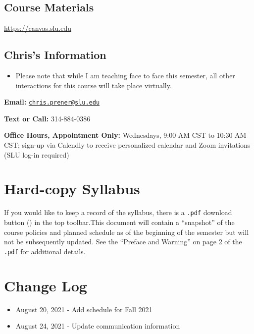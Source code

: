 \documentclass[
]{book}
\providecommand{\tightlist}{%
  \setlength{\itemsep}{0pt}\setlength{\parskip}{0pt}}
\newenvironment{rmdblock}[1]
  {\begin{shaded*}
  \begin{itemize}
  \renewcommand{\labelitemi}{
    \raisebox{-.7\height}[0pt][0pt]{
      {\setkeys{Gin}{width=3em,keepaspectratio}\texttt{[image: images/\#1]}}
    }
  }
  \item
  }
  {
  \end{itemize}
  \end{shaded*}
  }
\newenvironment{rmdwarning}
  {\begin{rmdblock}{warning}}
  {\end{rmdblock}}
\begin{document}
\hypertarget{course-materials}{%
\subsection*{Course Materials}\label{course-materials}}

\url{https://canvas.slu.edu}

\hypertarget{chriss-information}{%
\subsection*{Chris's Information}\label{chriss-information}}

\begin{rmdwarning}
Please note that while I am teaching face to face this semester, all
other interactions for this course will take place virtually.
\end{rmdwarning}

\textbf{Email:} \href{mailto:chris.prener@slu.edu}{\nolinkurl{chris.prener@slu.edu}}

\textbf{Text or Call:} 314-884-0386

\textbf{Office Hours, Appointment Only:} Wednesdays, 9:00 AM CST to 10:30 AM CST; sign-up via Calendly to receive personalized calendar and Zoom invitations (SLU log-in required)

\hypertarget{hard-copy-syllabus}{%
\section*{Hard-copy Syllabus}\label{hard-copy-syllabus}}

If you would like to keep a record of the syllabus, there is a \texttt{.pdf} download button () in the top toolbar.This document will contain a ``snapshot'' of the course policies and planned schedule as of the beginning of the semester but will not be subsequently updated. See the ``Preface and Warning'' on page 2 of the \texttt{.pdf} for additional details.

\hypertarget{change-log}{%
\section*{Change Log}\label{change-log}}

\begin{itemize}
\tightlist
\item
  August 20, 2021 - Add schedule for Fall 2021
\item
  August 24, 2021 - Update communication information
\end{itemize}
\end{document}
